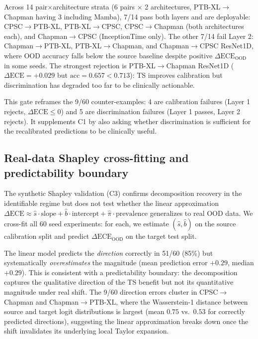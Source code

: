 \documentclass[review,12pt,nonatbib]{elsarticle}
\begin{document}
Across 14 pair$\times$architecture strata (6 pairs $\times$ 2
architectures, PTB-XL$\rightarrow$Chapman having 3 including Mamba),
7/14 pass both layers and are deployable: CPSC$\rightarrow$PTB-XL,
PTB-XL$\rightarrow$CPSC, CPSC$\rightarrow$Chapman (both architectures
each), and Chapman$\rightarrow$CPSC (InceptionTime only). The other
7/14 fail Layer 2: Chapman$\rightarrow$PTB-XL,
PTB-XL$\rightarrow$Chapman, and Chapman$\rightarrow$CPSC ResNet1D,
where OOD accuracy falls below the source baseline despite positive
$\Delta\text{ECE}_{\text{OOD}}$ in some seeds. The strongest rejection
is PTB-XL$\rightarrow$Chapman ResNet1D ($\Delta\text{ECE}=+0.029$ but
$\text{acc}=0.657 < 0.713$): TS improves calibration but
discrimination has degraded too far to be clinically actionable.

This gate reframes the 9/60 counter-examples: 4 are calibration
failures (Layer 1 rejects, $\Delta\text{ECE} \leq 0$) and 5 are
discrimination failures (Layer 1 passes, Layer 2 rejects). It
supplements C1 by also asking whether discrimination is sufficient
for the recalibrated predictions to be clinically useful.

\subsection{Real-data Shapley cross-fitting and predictability boundary}
\label{sec:real_shapley}
The synthetic Shapley validation (C3) confirms decomposition recovery
in the identifiable regime but does not test whether the linear
approximation $\Delta\text{ECE} \approx \hat{s} \cdot \text{slope} +
\hat{b} \cdot \text{intercept} + \hat{\pi} \cdot \text{prevalence}$
generalizes to real OOD data. We cross-fit all 60 seed experiments:
for each, we estimate $(\hat{s}, \hat{b})$ on the source calibration
split and predict $\Delta\text{ECE}_{\text{OOD}}$ on the target test
split.

The linear model predicts the \emph{direction} correctly in 51/60
(85\%) but systematically \emph{overestimates} the magnitude (mean
prediction error $+0.29$, median $+0.29$). This is consistent with a
predictability boundary: the decomposition captures the qualitative
direction of the TS benefit but not its quantitative magnitude under
real shift. The 9/60 direction errors cluster in
CPSC$\rightarrow$Chapman and Chapman$\rightarrow$PTB-XL, where the
Wasserstein-1 distance between source and target logit distributions
is largest (mean $0.75$ vs.\ $0.53$ for correctly predicted
directions), suggesting the linear approximation breaks down once the
shift invalidates its underlying local Taylor expansion.
\end{document}
